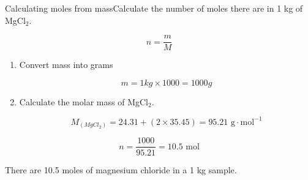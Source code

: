 \begin{wex}{Calculating moles from mass}{Calculate the number of moles there are in 1 kg of MgCl$_{2}$.\\}

{

\begin{equation*}
n = \frac{m}{M}
\end{equation*}
}

{

\begin{enumerate}
\item{Convert mass into grams}

\begin{equation*}
m = 1 kg \times 1000 = 1000 g
\end{equation*}

\item{Calculate the molar mass of MgCl$_{2}$.}

\begin{equation*}
M_{(MgCl_{2})} = 24.31 + (2 \times 35.45) = 95.21 \text{ g} \cdot \text{mol}^{-1}
\end{equation*}

\end{enumerate}
}

{

\begin{equation*}
n = \frac{1000}{95.21} = 10.5 \text{ mol}
\end{equation*}

There are 10.5 moles of magnesium chloride in a 1 kg sample.
}
\end{wex}



